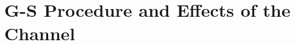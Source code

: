 \documentclass[../course]{subfiles}
\begin{document}
\chapter{G-S Procedure and Effects of the Channel}


\end{document}

